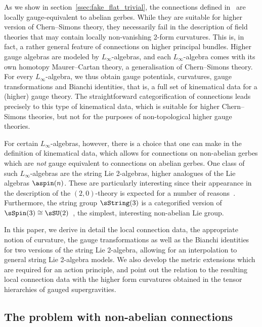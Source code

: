 \documentclass[reqno,a4paper,11pt]{article}
\begin{document}
As we show in section~\ref{ssec:fake_flat_trivial}, the connections defined in~\cite{Breen:math0106083,Aschieri:2003mw} are locally gauge-equivalent to abelian gerbes. While they are suitable for higher version of Chern--Simons theory, they necessarily fail in the description of field theories that may contain locally non-vanishing 2-form curvatures. This is, in fact, a rather general feature of connections on higher principal bundles. Higher gauge algebras are modeled by $L_\infty$-algebras, and each $L_\infty$-algebra comes with its own homotopy Maurer--Cartan theory, a generalisation of Chern--Simons theory. For every $L_\infty$-algebra, we thus obtain gauge potentials, curvatures, gauge transformations and Bianchi identities, that is, a full set of kinematical data for a (higher) gauge theory. The straightforward categorification of connections leads precisely to this type of kinematical data, which is suitable for higher Chern--Simons theories, but not for the purposes of non-topological higher gauge theories.

For certain $L_\infty$-algebras, however, there is a choice that one can make in the definition of kinematical data, which allows for connections on non-abelian gerbes which are {\em not} gauge equivalent to connections on abelian gerbes. One class of such $L_\infty$-algebras are the string Lie 2-algebras, higher analogues of the Lie algebras $\aspin(n)$. These are particularly interesting since their appearance in the description of the $(2,0)$-theory is expected for a number of reasons~\cite{Saemann:2019leg}. Furthermore, the string group $\sString(3)$ is a categorified version of $\sSpin(3)\cong \sSU(2)$~\cite{Saemann:2017rjm}, the simplest, interesting non-abelian Lie group.

In this paper, we derive in detail the local connection data, the appropriate notion of curvature, the gauge transformations as well as the Bianchi identities for two versions of the string Lie 2-algebra, allowing for an interpolation to general string Lie 2-algebra models. We also develop the metric extensions which are required for an action principle, and point out the relation to the resulting local connection data with the higher form curvatures obtained in the tensor hierarchies of gauged supergravities.

\subsection{The problem with non-abelian connections}
\end{document}
